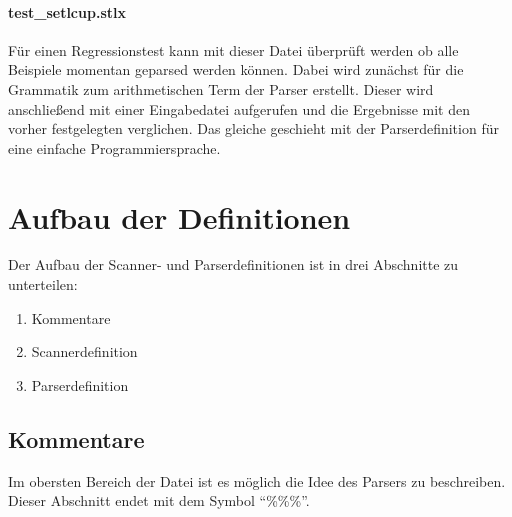 \paragraph{test\_setlcup.stlx} Für einen Regressionstest kann mit dieser Datei überprüft werden ob alle Beispiele momentan geparsed werden können. Dabei wird zunächst für die Grammatik zum arithmetischen Term der Parser erstellt. Dieser wird anschließend mit einer Eingabedatei aufgerufen und die Ergebnisse mit den vorher festgelegten verglichen. Das gleiche geschieht mit der Parserdefinition für eine einfache Programmiersprache.
\section{Aufbau der Definitionen}

Der Aufbau der Scanner- und Parserdefinitionen ist in drei Abschnitte zu unterteilen:
\begin{enumerate}
	\item Kommentare
	\item Scannerdefinition
	\item Parserdefinition
\end{enumerate}
\subsection{Kommentare}
Im obersten Bereich der Datei ist es möglich die Idee des Parsers zu beschreiben.
Dieser Abschnitt endet mit dem Symbol "`\%\%\%"'. 
